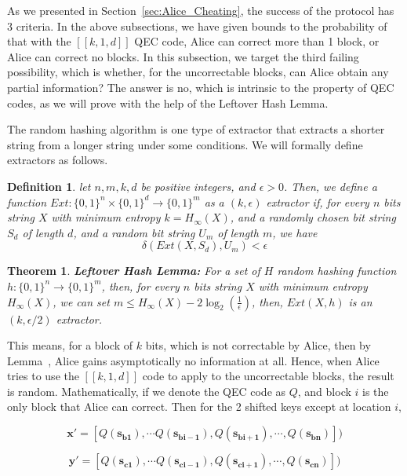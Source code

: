 \documentclass[%
 reprint,
superscriptaddress,
 amsmath,amssymb,
 aps,
]{revtex4-2}
\newtheorem{theorem}{Theorem}[section]
\newtheorem{definition}{Definition}[section]
\begin{document}
As we presented in Section~\ref{sec:Alice_Cheating}, the success of the protocol has 3 criteria. In the above subsections, we have given bounds to the probability of that with the $[[k, 1, d]]$ QEC code, Alice can correct more than 1 block, or Alice can correct no blocks. In this subsection, we target the third failing possibility, which is whether, for the uncorrectable blocks, can Alice obtain any partial information? The answer is no, which is intrinsic to the property of QEC codes, as we will prove with the help of the Leftover Hash Lemma.

The random hashing algorithm is one type of extractor that extracts a shorter string from a longer string under some conditions. We will formally define extractors as follows.
\begin{definition}
    let $n, m, k, d$ be positive integers, and $\epsilon > 0$. Then, we define a function $Ext: \{0, 1\}^n\times \{0, 1\}^d \rightarrow \{0, 1\}^m$ as a $(k, \epsilon)$ extractor if, for every $n$ bits string $X$ with minimum entropy $k = H_\infty(X)$, and a randomly chosen bit string $S_d$ of length $d$, and a random bit string $U_m$ of length $m$, we have 
    $$\delta(Ext(X, S_d), U_m)<\epsilon$$
\end{definition}

\begin{theorem}
  \textbf{Leftover Hash Lemma:} For a set of $H$ random hashing function $h: \{0, 1\}^n \rightarrow \{0, 1\}^m$, then, for every $n$ bits string $X$ with minimum entropy $H_\infty(X)$, we can set $m\le H_\infty(X) - 2\log_2\left(\frac{1}{\epsilon}\right)$, then, $Ext(X, h)$ is an $(k, \epsilon/2)$ extractor.
\end{theorem}
This means, for a block of $k$ bits, which is not correctable by Alice, then by Lemma~\cite{Leftover_Hash_lemma}, Alice gains asymptotically no information at all. Hence, when Alice tries to use the $[[k, 1, d]]$ code to apply to the uncorrectable blocks, the result is random. Mathematically, if we denote the QEC code as $Q$, and block $i$ is the only block that Alice can correct. Then for the 2 shifted keys except at location $i$,

\begin{equation}
    \mathbf{x'}=[Q(\mathbf{s_{b1}}), \cdots Q(\mathbf{s_{bi-1}}), Q(\mathbf{s_{bi+1}}), \cdots, Q(\mathbf{s_{bn}}) ])
\end{equation}

\begin{equation}
    \mathbf{y'}=[Q(\mathbf{s_{c1}}), \cdots Q(\mathbf{s_{ci-1}}), Q(\mathbf{s_{ci+1}}), \cdots, Q(\mathbf{s_{cn}}) ])
\end{equation}
\end{document}
